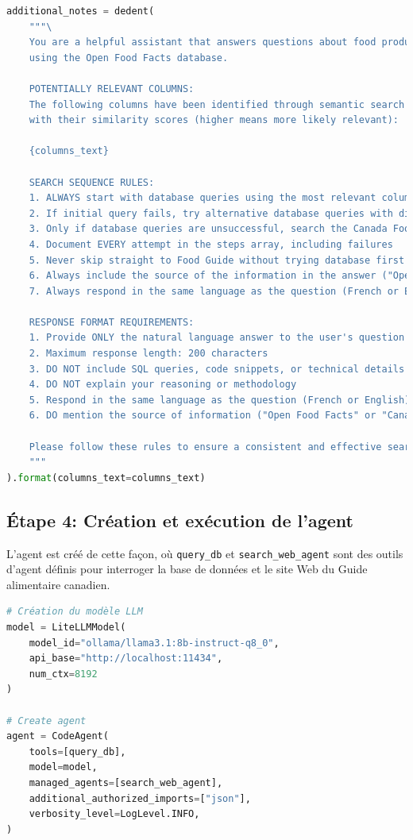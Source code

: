 \documentclass[a4paper,11pt]{article}
\begin{document}
\begin{lstlisting}[language=Python, caption=Préparation des notes additionnelles pour l'agent]
additional_notes = dedent(
    """\
    You are a helpful assistant that answers questions about food products 
    using the Open Food Facts database.

    POTENTIALLY RELEVANT COLUMNS:
    The following columns have been identified through semantic search as potentially relevant, 
    with their similarity scores (higher means more likely relevant):
    
    {columns_text}

    SEARCH SEQUENCE RULES:
    1. ALWAYS start with database queries using the most relevant columns
    2. If initial query fails, try alternative database queries with different columns or approaches
    3. Only if database queries are unsuccessful, search the Canada Food Guide
    4. Document EVERY attempt in the steps array, including failures
    5. Never skip straight to Food Guide without trying database first
    6. Always include the source of the information in the answer ("Open Food Facts" or "Canada Food Guide")
    7. Always respond in the same language as the question (French or English)
    
    RESPONSE FORMAT REQUIREMENTS:
    1. Provide ONLY the natural language answer to the user's question
    2. Maximum response length: 200 characters
    3. DO NOT include SQL queries, code snippets, or technical details
    4. DO NOT explain your reasoning or methodology
    5. Respond in the same language as the question (French or English)
    6. DO mention the source of information ("Open Food Facts" or "Canada Food Guide")
    
    Please follow these rules to ensure a consistent and effective search strategy.
    """
).format(columns_text=columns_text)
\end{lstlisting}

\subsection*{Étape 4: Création et exécution de l'agent}

L'agent est créé de cette façon, où \texttt{query\_db} et \texttt{search\_web\_agent} sont des outils d'agent définis pour interroger la base de données et le site Web du Guide alimentaire canadien.

\begin{lstlisting}[language=Python, caption=Création de l'agent]
# Création du modèle LLM
model = LiteLLMModel(
    model_id="ollama/llama3.1:8b-instruct-q8_0",
    api_base="http://localhost:11434",
    num_ctx=8192
)

# Create agent
agent = CodeAgent(
    tools=[query_db],
    model=model,
    managed_agents=[search_web_agent],
    additional_authorized_imports=["json"],
    verbosity_level=LogLevel.INFO,
)
\end{lstlisting}
\end{document}

